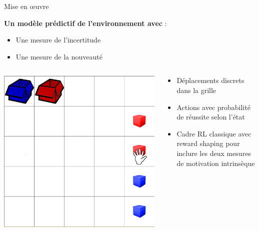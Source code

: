 \documentclass[xcolor=pst,dvips,12pt,english,french]{beamer}
\begin{document}
	\begin{frame}{Mise en \oe{}uvre}
		\begin{block}{}
			\textbf{Un modèle prédictif de l'environnement avec} : 
			\begin{itemize}
				\item Une mesure de l'incertitude 
				\item Une mesure de la nouveauté 
			\end{itemize}
		\end{block}
		\begin{columns}
			\begin{column}{0.4\textwidth}
				\centering
				\includegraphics[width=\textwidth, trim={0 0 1cm 0, clip}]{images/playroom3.eps}
			\end{column}
			\begin{column}{0.5\textwidth}
				\begin{alertblock}{}
					\begin{itemize}
						\item Déplacements discrets dans la grille
						\item Actions avec probabilité de réussite selon l'état
						\item Cadre RL classique avec reward shaping pour inclure les deux mesures de motivation intrinsèque
					\end{itemize}
				\end{alertblock}
			\end{column}
		\end{columns}
	\end{frame}
	
\end{document}
